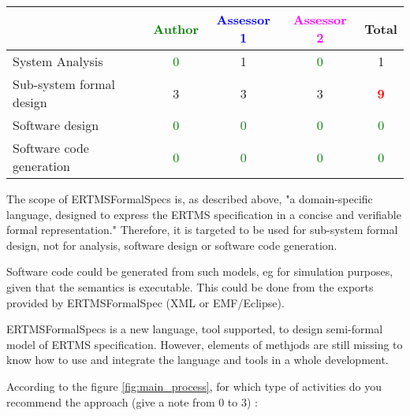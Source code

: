 \begin{tabular}{|l | c | c | c | c|}
\hline
& \textcolor{green}{Author} & \textcolor{blue}{Assessor 1} & \textcolor{magenta}{Assessor 2} & Total \\
\hline 
System Analysis & \textcolor{green}{0} & 1     & \textcolor{green}{0} & 1     \\
\hline
Sub-system formal design & 3     & 3     & 3     & \textcolor{red}{\textbf{9}} \\
\hline
Software design & \textcolor{green}{0} & \textcolor{green}{0} & \textcolor{green}{0} & \textcolor{green}{0} \\
\hline
Software code generation & \textcolor{green}{0} & \textcolor{green}{0} & \textcolor{green}{0} & \textcolor{green}{0} \\
\hline
\end{tabular}

\begin{author_comment}
The scope of ERTMSFormalSpecs is, as described above, "a domain-specific language, designed to express the ERTMS specification in a concise and verifiable formal representation."
Therefore, it is targeted to be used for sub-system formal design, not for analysis, software design or software code generation.
\end{author_comment}

\begin{assessor1}
Software code could be generated from such models, eg for simulation purposes, given that the semantics is executable. This could be done from the exports provided by ERTMSFormalSpec (XML or EMF/Eclipse). 
\end{assessor1}

\begin{assessor2}
ERTMSFormalSpecs is a new language, tool supported, to design semi-formal model of ERTMS specification. However, elements of methjods are still missing to know how to use and integrate the language and tools in a whole development. 
\end{assessor2}

According to the figure \ref{fig:main_process}, for which type of activities do you recommend the approach (give a note from 0 to  3) :

